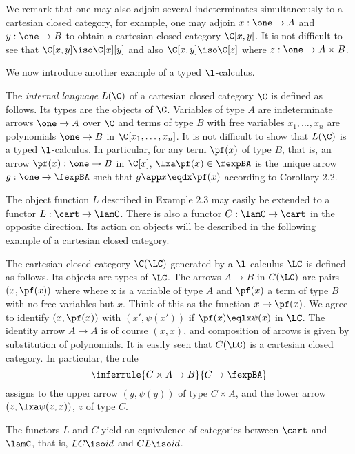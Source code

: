 We remark that one may also adjoin several indeterminates simultaneously
to a cartesian closed category, for example, one may adjoin $x :\one \to A$
and $y : \one \to B$ to obtain a cartesian closed category $\C[x,y]$.
It is not difficult to see that $\C[x,y]\iso \C[x][y]$
and also $\C[x,y]\iso \C[z]$ where $z: \one \to A \times B$.

We now introduce another example of a typed $\l$-calculus.

\begin{example}
The {\em internal language} $L(\C)$ of a cartesian closed
category $\C$ is defined as follows.
Its types are the objects of $\C$. Variables of type
$A$ are indeterminate arrows $\one \to A$ over $\C$
and terms of type $B$ with free
variables $x_1, \dots, x_n$ are polynomials $\one \to B$ in
$\C[x_1, \dots, x_n]$. It is not difficult to show that
$L(\C)$ is a typed $\l$-calculus. In particular, for any term $\pf(x)$
of type $B$, that is, an arrow $\pf(x): \one \to B$ in $\C[x]$,
$\lxa \pf(x) \in \fexpBA$ is the unique arrow $g: \one \to \fexpBA$ such that
$g \app x \eqdx \pf(x)$ according to Corollary 2.2.
\end{example}

The object function $L$ described in Example 2.3 may easily be extended
to a functor $L: \cart \to \lamC$. There is also a functor $C: \lamC \to \cart$ in
the opposite direction. Its action on objects will be described in the
following example of a cartesian closed category.

\begin{example}
The cartesian closed category $\C(\LC)$ generated by a
$\l$-calculus $\LC$ is defined as follows.
Its objects are types of $\LC$. The arrows $A \to B$ in $C(\LC)$ are
pairs $(x, \pf(x))$ where where x is a variable of type $A$ and $\pf(x)$ a term
of type $B$ with no free variables but $x$. Think of this as the
function $x \mapsto \pf(x)$. We agree to identify $(x,\pf(x))$ with $(x', \psi(x'))$
if $\pf(x) \eqlx \psi(x)$ in $\LC$. The identity arrow $A \to A$ is of course $(x,x)$,
and composition of arrows is given by substitution of polynomials. It is easily
seen that $C(\LC)$ is a cartesian closed category. In particular, the rule
\[
\inferrule{C \times A \to B}{C \to \fexpBA}
\]
assigns to the upper arrow $(y,\psi(y))$ of type $C \times A$, and the lower arrow
$(z, \lxa \psi(z,x))$, $z$ of type $C$.
\end{example}

\begin{thm}
The functors $L$ and $C$ yield an equivalence of categories
between $\cart$ and $\lamC$, that is, $LC \iso id$ and $CL \iso id$.
\end{thm}

